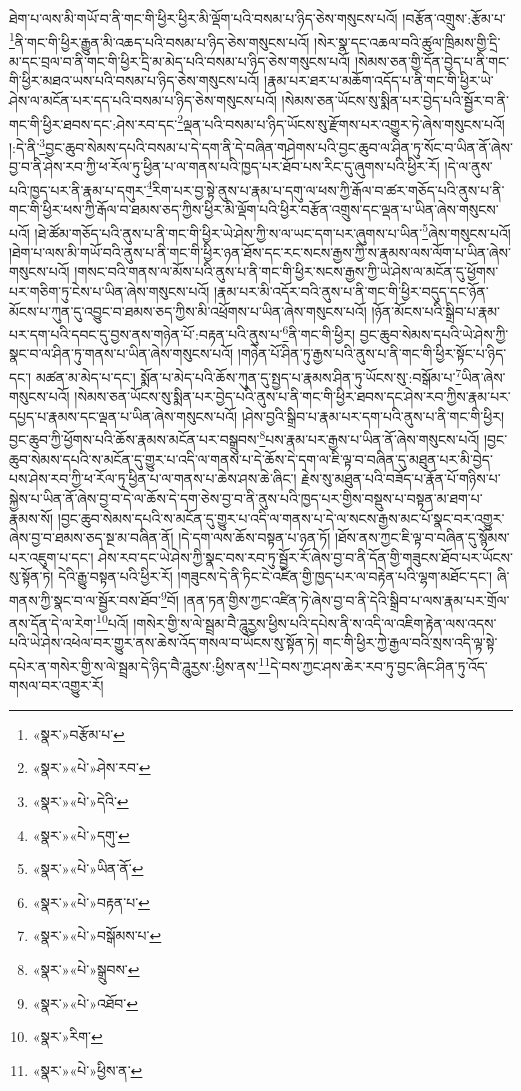 ཐེག་པ་ལས་མི་གཡོ་བ་ནི་གང་གི་ཕྱིར་ཕྱིར་མི་ལྡོག་པའི་བསམ་པ་ཉིད་ཅེས་གསུངས་པའོ། །བརྩོན་འགྲུས་:རྩོམ་པ་\footnote{«སྣར་»བརྩོམ་པ་}ནི་གང་གི་ཕྱིར་རྒྱུན་མི་འཆད་པའི་བསམ་པ་ཉིད་ཅེས་གསུངས་པའོ། །སེར་སྣ་དང་འཆལ་བའི་ཚུལ་ཁྲིམས་གྱི་དྲི་མ་དང་བྲལ་བ་ནི་གང་གི་ཕྱིར་དྲི་མ་མེད་པའི་བསམ་པ་ཉིད་ཅེས་གསུངས་པའོ། །སེམས་ཅན་གྱི་དོན་བྱེད་པ་ནི་གང་གི་ཕྱིར་མཐའ་ཡས་པའི་བསམ་པ་ཉིད་ཅེས་གསུངས་པའོ། །རྣམ་པར་ཐར་པ་མཆོག་འདོད་པ་ནི་གང་གི་ཕྱིར་ཡེ་ཤེས་ལ་མངོན་པར་དད་པའི་བསམ་པ་ཉིད་ཅེས་གསུངས་པའོ། །སེམས་ཅན་ཡོངས་སུ་སྨིན་པར་བྱེད་པའི་སྦྱོར་བ་ནི་གང་གི་ཕྱིར་ཐབས་དང་:ཤེས་རབ་དང་\footnote{«སྣར་»«པེ་»ཤེས་རབ་}ལྡན་པའི་བསམ་པ་ཉིད་ཡོངས་སུ་རྫོགས་པར་འགྱུར་ཏེ་ཞེས་གསུངས་པའོ། །:དེ་ནི་\footnote{«སྣར་»«པེ་»དེའི་}བྱང་ཆུབ་སེམས་དཔའི་བསམ་པ་དེ་དག་ནི་དེ་བཞིན་གཤེགས་པའི་བྱང་ཆུབ་ལ་ཤིན་ཏུ་སོང་བ་ཡིན་ནོ་ཞེས་བྱ་བ་ནི་ཤེས་རབ་ཀྱི་ཕ་རོལ་ཏུ་ཕྱིན་པ་ལ་གནས་པའི་ཁྱད་པར་ཐོབ་པས་རིང་དུ་ཞུགས་པའི་ཕྱིར་རོ། །དེ་ལ་ནུས་པའི་ཁྱད་པར་ནི་རྣམ་པ་དགུར་\footnote{«སྣར་»«པེ་»དགུ་}རིག་པར་བྱ་སྟེ་ནུས་པ་རྣམ་པ་དགུ་ལ་ཕས་ཀྱི་རྒོལ་བ་ཚར་གཅོད་པའི་ནུས་པ་ནི་གང་གི་ཕྱིར་ཕས་ཀྱི་རྒོལ་བ་ཐམས་ཅད་ཀྱིས་ཕྱིར་མི་ལྡོག་པའི་ཕྱིར་བརྩོན་འགྲུས་དང་ལྡན་པ་ཡིན་ཞེས་གསུངས་པའོ། །ཐེ་ཚོམ་གཅོད་པའི་ནུས་པ་ནི་གང་གི་ཕྱིར་ཡེ་ཤེས་ཀྱི་ས་ལ་ཡང་དག་པར་ཞུགས་པ་ཡིན་\footnote{«སྣར་»«པེ་»ཡིན་ནོ་}ཞེས་གསུངས་པའོ། །ཐེག་པ་ལས་མི་གཡོ་བའི་ནུས་པ་ནི་གང་གི་ཕྱིར་ཉན་ཐོས་དང་རང་སངས་རྒྱས་ཀྱི་ས་རྣམས་ལས་ལོག་པ་ཡིན་ཞེས་གསུངས་པའོ། །གསང་བའི་གནས་ལ་མོས་པའི་ནུས་པ་ནི་གང་གི་ཕྱིར་སངས་རྒྱས་ཀྱི་ཡེ་ཤེས་ལ་མངོན་དུ་ཕྱོགས་པར་གཅིག་ཏུ་ངེས་པ་ཡིན་ཞེས་གསུངས་པའོ། །རྣམ་པར་མི་འདོར་བའི་ནུས་པ་ནི་གང་གི་ཕྱིར་བདུད་དང་ཉོན་མོངས་པ་ཀུན་དུ་འབྱུང་བ་ཐམས་ཅད་ཀྱིས་མི་འཕྲོགས་པ་ཡིན་ཞེས་གསུངས་པའོ། །ཉོན་མོངས་པའི་སྒྲིབ་པ་རྣམ་པར་དག་པའི་དབང་དུ་བྱས་ནས་གཉེན་པོ་:བརྟན་པའི་ནུས་པ་\footnote{«སྣར་»«པེ་»བརྟན་པ་}ནི་གང་གི་ཕྱིར། བྱང་ཆུབ་སེམས་དཔའི་ཡེ་ཤེས་ཀྱི་སྣང་བ་ལ་ཤིན་ཏུ་གནས་པ་ཡིན་ཞེས་གསུངས་པའོ། །གཉེན་པོ་ཤིན་ཏུ་རྒྱས་པའི་ནུས་པ་ནི་གང་གི་ཕྱིར་སྟོང་པ་ཉིད་དང་། མཚན་མ་མེད་པ་དང་། སྨོན་པ་མེད་པའི་ཆོས་ཀུན་དུ་སྤྱད་པ་རྣམས་ཤིན་ཏུ་ཡོངས་སུ་:བསྒོམ་པ་\footnote{«སྣར་»«པེ་»བསྒོམས་པ་}ཡིན་ཞེས་གསུངས་པའོ། །སེམས་ཅན་ཡོངས་སུ་སྨིན་པར་བྱེད་པའི་ནུས་པ་ནི་གང་གི་ཕྱིར་ཐབས་དང་ཤེས་རབ་ཀྱིས་རྣམ་པར་དཔྱད་པ་རྣམས་དང་ལྡན་པ་ཡིན་ཞེས་གསུངས་པའོ། །ཤེས་བྱའི་སྒྲིབ་པ་རྣམ་པར་དག་པའི་ནུས་པ་ནི་གང་གི་ཕྱིར། བྱང་ཆུབ་ཀྱི་ཕྱོགས་པའི་ཆོས་རྣམས་མངོན་པར་བསྒྲུབས་\footnote{«སྣར་»«པེ་»སྒྲུབས་}པས་རྣམ་པར་རྒྱས་པ་ཡིན་ནོ་ཞེས་གསུངས་པའོ། །བྱང་ཆུབ་སེམས་དཔའི་ས་མངོན་དུ་གྱུར་པ་འདི་ལ་གནས་པ་དེ་ཆོས་དེ་དག་ལ་ཇི་ལྟ་བ་བཞིན་དུ་མཐུན་པར་མི་བྱེད་པས་ཤེས་རབ་ཀྱི་ཕ་རོལ་ཏུ་ཕྱིན་པ་ལ་གནས་པ་ཆེས་ཤས་ཆེ་ཞིང་། རྗེས་སུ་མཐུན་པའི་བཟོད་པ་རྣོན་པོ་གཉིས་པ་སྐྱེས་པ་ཡིན་ནོ་ཞེས་བྱ་བ་དེ་ལ་ཆོས་དེ་དག་ཅེས་བྱ་བ་ནི་ནུས་པའི་ཁྱད་པར་གྱིས་བསྡུས་པ་བསྟན་མ་ཐག་པ་རྣམས་སོ། །བྱང་ཆུབ་སེམས་དཔའི་ས་མངོན་དུ་གྱུར་པ་འདི་ལ་གནས་པ་དེ་ལ་སངས་རྒྱས་མང་པོ་སྣང་བར་འགྱུར་ཞེས་བྱ་བ་ཐམས་ཅད་སྔ་མ་བཞིན་ནོ། །དེ་དག་ལས་ཆོས་བསྟན་པ་ཉན་ཏོ། །ཐོས་ནས་ཀྱང་ཇི་ལྟ་བ་བཞིན་དུ་སྙོམས་པར་འཇུག་པ་དང་། ཤེས་རབ་དང་ཡེ་ཤེས་ཀྱི་སྣང་བས་རབ་ཏུ་སྦྱོར་རོ་ཞེས་བྱ་བ་ནི་དོན་གྱི་གཟུངས་ཐོབ་པར་ཡོངས་སུ་སྟོན་ཏེ། དེའི་རྒྱུ་བསྟན་པའི་ཕྱིར་རོ། །གཟུངས་དེ་ནི་ཏིང་ངེ་འཛིན་གྱི་ཁྱད་པར་ལ་བརྟེན་པའི་ལྷག་མཐོང་དང་། ཞི་གནས་ཀྱི་སྣང་བ་ལ་སྦྱོར་བས་ཐོབ་\footnote{«སྣར་»«པེ་»འཐོབ་}བོ། །ནན་ཏན་གྱིས་ཀྱང་འཛིན་ཏེ་ཞེས་བྱ་བ་ནི་དེའི་སྒྲིབ་པ་ལས་རྣམ་པར་གྲོལ་ནས་དོན་དེ་ལ་རེག་\footnote{«སྣར་»རིག་}པའོ། །གསེར་གྱི་ས་ལེ་སྦྲམ་བཻ་ཌཱུརྱས་ཕྱིས་པའི་དཔེས་ནི་ས་འདི་ལ་འཇིག་རྟེན་ལས་འདས་པའི་ཡེ་ཤེས་འཕེལ་བར་གྱུར་ནས་ཆེས་འོད་གསལ་བ་ཡོངས་སུ་སྟོན་ཏེ། གང་གི་ཕྱིར་ཀྱེ་རྒྱལ་བའི་སྲས་འདི་ལྟ་སྟེ་དཔེར་ན་གསེར་གྱི་ས་ལེ་སྦྲམ་དེ་ཉིད་བཻ་ཌཱུརྱས་:ཕྱིས་ནས་\footnote{«སྣར་»«པེ་»ཕྱིས་ན་}དེ་བས་ཀྱང་ཤས་ཆེར་རབ་ཏུ་བྱང་ཞིང་ཤིན་ཏུ་འོད་གསལ་བར་འགྱུར་རོ། 